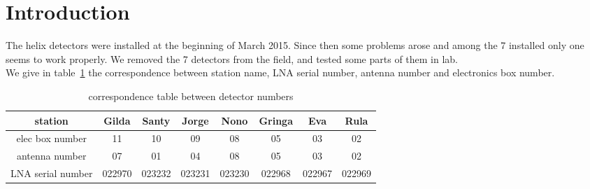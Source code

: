 \section{Introduction}
The  helix  detectors  were   installed  at  the  beginning  of  March
2015. Since  then some problems arose  and among the  7 installed only
one seems to work properly. We removed the 7 detectors from the field,
and   tested   some   parts   of   them   in   lab.\\   We   give   in
table~\ref{tab:detref}  the correspondence  between station  name, LNA
serial number, antenna number and electronics box number.
\begin{table}[h!]
  \centering
  \caption{correspondence table between detector numbers}
  \label{tab:detref}
  \begin{tabular}{|c||c|c|c|c|c|c|c|}
    \hline
    station & Gilda  & Santy &  Jorge & Nono & Gringa & Eva & Rula \\
    \hline
    elec box number  & 11  & 10 & 09 & 08 & 05 & 03 & 02 \\
    \hline
    antenna number & 07 & 01 & 04 & 08 & 05 & 03 & 02 \\
    \hline
    LNA serial number & 022970 & 023232 & 023231 & 023230 & 022968 & 022967 & 022969\\
    \hline
  \end{tabular}
\end{table}




